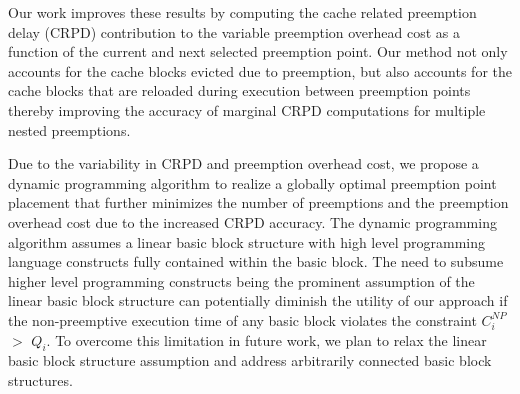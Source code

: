 Our work improves these results by computing the cache related preemption delay (CRPD) contribution to the variable preemption overhead cost as a function of the current and next selected preemption point.  Our method not only accounts for the cache blocks evicted due to preemption, but also accounts for the cache blocks that are reloaded during execution between preemption points thereby improving the accuracy of marginal CRPD computations for multiple nested preemptions.

Due to the variability in CRPD and preemption overhead cost, we propose a dynamic programming algorithm to realize a globally optimal preemption point placement that further minimizes the number of preemptions and the preemption overhead cost due to the increased CRPD accuracy.  The dynamic programming algorithm assumes a linear basic block structure with high level programming language constructs fully contained within the basic block.  The need to subsume higher level programming constructs being the prominent assumption of the linear basic block structure can potentially diminish the utility of our approach if the non-preemptive execution time of any basic block violates the constraint \begin{math}C_{i}^{NP}\end{math} \begin{math}>\end{math} \begin{math}Q_{i}\end{math}. To overcome this limitation in future work, we plan to relax the linear basic block structure assumption and address arbitrarily connected basic block structures.
